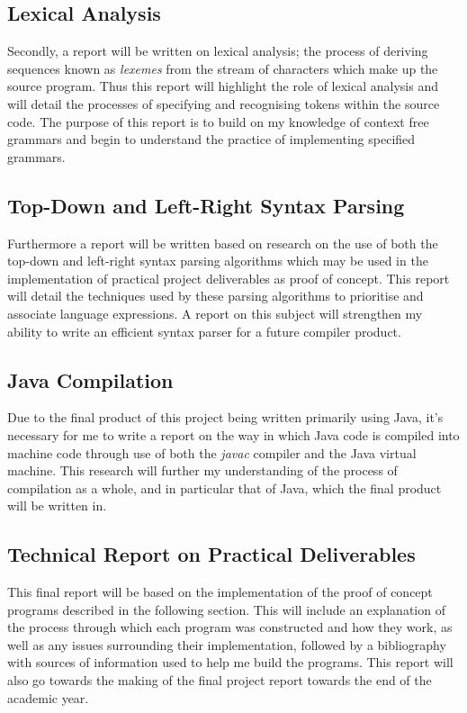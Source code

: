 \documentclass[a4paper, 11pt]{article}
\begin{document}
\subsection{Lexical Analysis}
Secondly, a report will be written on lexical analysis; the process of deriving sequences known as \textit{lexemes} from the stream of characters which make up the source program. Thus this report will highlight the role of lexical analysis and will detail the processes of specifying and recognising tokens within the source code. The purpose of this report is to build on my knowledge of context free grammars and begin to understand the practice of implementing specified grammars.

\subsection{Top-Down and Left-Right Syntax Parsing}
Furthermore a report will be written based on research on the use of both the top-down and left-right syntax parsing algorithms which may be used in the implementation of practical project deliverables as proof of concept. This report will detail the techniques used by these parsing algorithms to prioritise and associate language expressions. A report on this subject will strengthen my ability to write an efficient syntax parser for a future compiler product.

\subsection{Java Compilation}
Due to the final product of this project being written primarily using Java, it's necessary for me to write a report on the way in which Java code is compiled into machine code through use of both the \textit{javac} compiler and the Java virtual machine. This research will further my understanding of the process of compilation as a whole, and in particular that of Java, which the final product will be written in.

\subsection{Technical Report on Practical Deliverables}
This final report will be based on the implementation of the proof of concept programs described in the following section. This will include an explanation of the process through which each program was constructed and how they work, as well as any issues surrounding their implementation, followed by a bibliography with sources of information used to help me build the programs. This report will also go towards the making of the final project report towards the end of the academic year.
\end{document}
